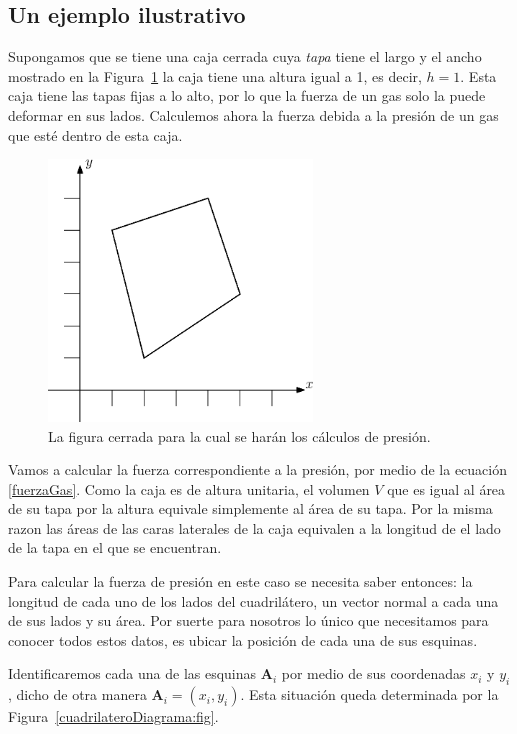 \subsection{Un ejemplo ilustrativo}

Supongamos que se tiene una caja cerrada cuya \emph{tapa} tiene el largo y el ancho mostrado en la Figura~\ref{cuadrilatero:fig} la caja tiene una altura igual a 1, es decir, $h=1$. Esta caja tiene las tapas fijas a lo alto, por lo que la fuerza de un gas solo la puede deformar en sus lados.
Calculemos ahora la fuerza debida a la presión de un gas que esté dentro de esta caja.

\begin{figure}
 \centering
 \includegraphics[width=7cm]{Img/01/cuadrilatero}
 \caption[Cuadrilátero]{ 
 La figura cerrada para la cual se harán los cálculos de presión.
 } \label{cuadrilatero:fig}
\end{figure}

Vamos a calcular la fuerza correspondiente a la presión, por medio de la ecuación \eqref{fuerzaGas}.
Como la caja es de altura unitaria, el volumen $V$ que es igual al área de su tapa por la altura equivale simplemente al área de su tapa.
Por la misma razon las áreas de las caras laterales de la caja equivalen a la longitud de el lado de la tapa en el que se encuentran.

Para calcular la fuerza de presión en este caso se necesita saber entonces: la longitud de cada uno de los lados del cuadrilátero, un vector normal a cada una de sus lados y su área.
Por suerte para nosotros lo único que necesitamos para conocer todos estos datos, es ubicar la posición de cada una de sus esquinas.

Identificaremos cada una de las esquinas $\textbf{A}_i$ por medio de sus coordenadas $x_i$ y $y_i$, dicho de otra manera $\textbf{A}_i = ( x_i , y_i)$.
Esta situación queda determinada por la Figura~\ref{cuadrilateroDiagrama:fig}.

